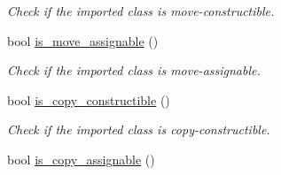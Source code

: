 \begin{DoxyCompactItemize}
\begin{DoxyCompactList}\small\item\em Check if the imported class is move-\/constructible. \end{DoxyCompactList}\item 
bool \hyperlink{a00155_ac0c08ef84b2659240001af9f346e7d85}{is\+\_\+move\+\_\+assignable} ()\hypertarget{a00155_ac0c08ef84b2659240001af9f346e7d85}{}\label{a00155_ac0c08ef84b2659240001af9f346e7d85}

\begin{DoxyCompactList}\small\item\em Check if the imported class is move-\/assignable. \end{DoxyCompactList}\item 
bool \hyperlink{a00155_a8a6beccfbcee584e8cc4c6ee1989e4ce}{is\+\_\+copy\+\_\+constructible} ()\hypertarget{a00155_a8a6beccfbcee584e8cc4c6ee1989e4ce}{}\label{a00155_a8a6beccfbcee584e8cc4c6ee1989e4ce}

\begin{DoxyCompactList}\small\item\em Check if the imported class is copy-\/constructible. \end{DoxyCompactList}\item 
bool \hyperlink{a00155_a00a39e705beafb32b8e37d704437e251}{is\+\_\+copy\+\_\+assignable} ()\hypertarget{a00155_a00a39e705beafb32b8e37d704437e251}{}\label{a00155_a00a39e705beafb32b8e37d704437e251}


\end{DoxyCompactItemize}
